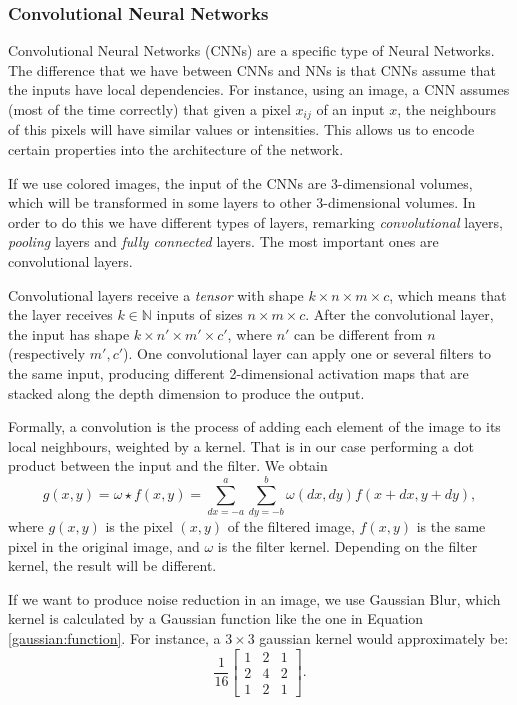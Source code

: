 \subsubsection*{Convolutional Neural Networks}

Convolutional Neural Networks (CNNs) are a specific type of Neural Networks. The difference that we have between CNNs and NNs is that CNNs assume that the inputs have local dependencies. For instance, using an image, a CNN assumes (most of the time correctly) that given a pixel $x_{ij}$ of an input $x$, the neighbours of this pixels will have similar values or intensities. This allows us to encode certain properties into the architecture of the network.

If we use colored images, the input of the CNNs are 3-dimensional volumes, which will be transformed in some layers to other 3-dimensional volumes. In order to do this we have different types of layers, remarking \emph{convolutional} layers, \emph{pooling} layers and \emph{fully connected} layers. The most important ones are convolutional layers.

Convolutional layers receive a \emph{tensor} with shape $k \times n \times m \times c$, which means that the layer receives $k \in \mathbb N$ inputs of sizes $n \times m \times c$.  After the convolutional layer, the input has shape $k \times n' \times m' \times c'$, where $n'$ can be different from $n$ (respectively $m',c'$). One convolutional layer can apply one or several filters to the same input, producing different 2-dimensional activation maps that are stacked along the depth dimension to produce the output.

Formally, a convolution is the process of adding each element of the image to its local neighbours, weighted by a kernel. That is in our case performing a dot product between the input and the filter. We obtain
\[
g(x,y) = \omega \star f(x,y) = \sum_{dx = -a}^a \sum_{dy = -b}^b \omega(dx,dy)f(x+dx,y+dy),    
\]
where $g(x,y)$ is the pixel $(x,y)$ of the filtered image, $f(x,y)$ is the same pixel in the original image, and $\omega$ is the filter kernel. Depending on the filter kernel, the result will be different. 
\begin{nexample}
If we want to produce noise reduction in an image, we use Gaussian Blur, which kernel is calculated by a Gaussian function like the one in Equation \eqref{gaussian:function}. For instance, a $3\times 3 $ gaussian kernel would approximately be:
\[
\frac{1}{16}\begin{bmatrix}
    1 & 2 & 1\\
    2 & 4 & 2\\
    1 & 2 & 1
\end{bmatrix}.
\]
\end{nexample}

